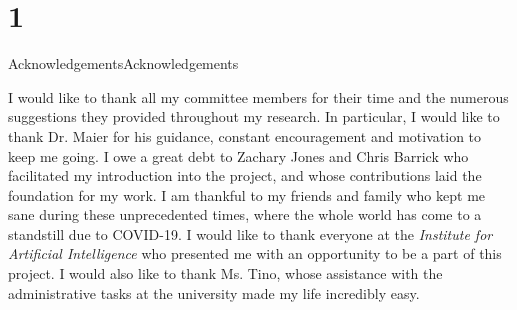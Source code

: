 \chapter{1}{Acknowledgements}{Acknowledgements}
\par I would like to thank all my committee members for their time and the numerous suggestions they provided throughout my research. In particular, I would like to thank Dr. Maier for his guidance, constant encouragement and motivation to keep me going. I owe a great debt to Zachary Jones and Chris Barrick who facilitated my introduction into the project, and whose contributions laid the foundation for my work. I am thankful to my friends and family who kept me sane during these unprecedented times, where the whole world has come to a standstill due to COVID-19. I would like to thank everyone at the \textit{Institute for Artificial Intelligence} who presented me with an opportunity to be a part of this project. I would also like to thank Ms. Tino, whose assistance with the administrative tasks at the university made my life incredibly easy.

\newpage